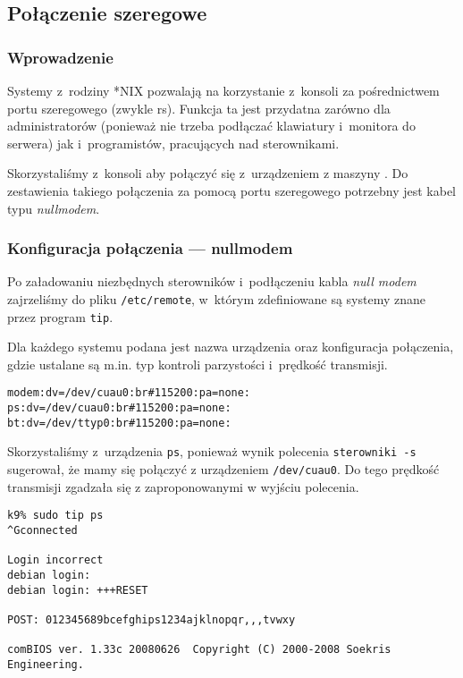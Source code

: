 \subsection{Połączenie szeregowe}

\subsubsection{Wprowadzenie}

Systemy z~rodziny *NIX pozwalają na korzystanie z~konsoli za pośrednictwem portu
szeregowego (zwykle rs). Funkcja ta jest przydatna zarówno dla
administratorów (ponieważ nie trzeba podłączać klawiatury i~monitora do serwera)
jak i~programistów, pracujących nad sterownikami.

Skorzystaliśmy z~konsoli aby połączyć się z~urządzeniem \zielone{} z maszyny
\kdziew. Do zestawienia takiego połączenia za pomocą portu szeregowego potrzebny
jest kabel typu \emph{null\dywiz modem}\cite{serial-console}.

\subsubsection{Konfiguracja połączenia --- null\dywiz modem}
\label{sec:serial:null-modem}

Po załadowaniu niezbędnych sterowników i~podłączeniu kabla \emph{null\dywiz
modem} zajrzeliśmy do pliku \texttt{/etc/remote}, w~którym zdefiniowane są
systemy znane przez program \texttt{tip}.

Dla każdego systemu podana jest nazwa urządzenia oraz konfiguracja połączenia,
gdzie ustalane są m.in. typ kontroli parzystości i~prędkość transmisji.

\begin{lstlisting}[caption={\texttt{/etc/remote}}]
modem:dv=/dev/cuau0:br#115200:pa=none:
ps:dv=/dev/cuau0:br#115200:pa=none:
bt:dv=/dev/ttyp0:br#115200:pa=none:
\end{lstlisting}

Skorzystaliśmy z~urządzenia \texttt{ps}, ponieważ wynik polecenia
\texttt{sterowniki -s} sugerował, że mamy się połączyć z urządzeniem
\texttt{/dev/cuau0}. Do tego prędkość transmisji zgadzała się z zaproponowanymi
w wyjściu polecenia.

\begin{lstlisting}[caption={Połączenie z konsolą maszyny \zielone{} za pomocą programu \texttt{tip}.}]
k9% sudo tip ps
^Gconnected

Login incorrect
debian login:
debian login: +++RESET

POST: 012345689bcefghips1234ajklnopqr,,,tvwxy

comBIOS ver. 1.33c 20080626  Copyright (C) 2000-2008 Soekris Engineering.
\end{lstlisting}

